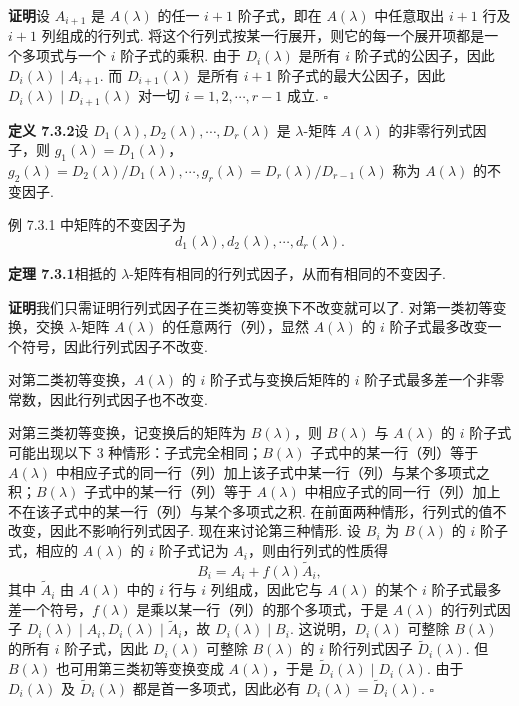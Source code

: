 \documentclass[UTF8, 12pt, fontset=fandol, oneside]{ctexart}
\begin{document}
\noindent\textbf{证明}\quad 设 $A_{i+1}$ 是 $A(\lambda)$ 的任一 $i+1$ 阶子式，即在 $A(\lambda)$ 中任意取出 $i+1$ 行及 $i+1$ 列组成的行列式. 将这个行列式按某一行展开，则它的每一个展开项都是一个多项式与一个 $i$ 阶子式的乘积. 由于 $D_i(\lambda)$ 是所有 $i$ 阶子式的公因子，因此 $D_i(\lambda)\mid A_{i+1}$. 而 $D_{i+1}(\lambda)$ 是所有 $i+1$ 阶子式的最大公因子，因此 $D_i(\lambda)\mid D_{i+1}(\lambda)$ 对一切 $i=1,2,\cdots,r-1$ 成立. $\square$

\noindent\textbf{定义 7.3.2}\quad 设 $D_1(\lambda),D_2(\lambda),\cdots,D_r(\lambda)$ 是 $\lambda$-矩阵 $A(\lambda)$ 的非零行列式因子，则 $g_1(\lambda)=D_1(\lambda)$，$g_2(\lambda)=D_2(\lambda)/D_1(\lambda),\cdots,g_r(\lambda)=D_r(\lambda)/D_{r-1}(\lambda)$ 称为 $A(\lambda)$ 的不变因子.

例 7.3.1 中矩阵的不变因子为
\[
d_1(\lambda),d_2(\lambda),\cdots,d_r(\lambda).
\]

\noindent\textbf{定理 7.3.1}\quad 相抵的 $\lambda$-矩阵有相同的行列式因子，从而有相同的不变因子.

\noindent\textbf{证明}\quad 我们只需证明行列式因子在三类初等变换下不改变就可以了. 对第一类初等变换，交换 $\lambda$-矩阵 $A(\lambda)$ 的任意两行（列），显然 $A(\lambda)$ 的 $i$ 阶子式最多改变一个符号，因此行列式因子不改变.

对第二类初等变换，$A(\lambda)$ 的 $i$ 阶子式与变换后矩阵的 $i$ 阶子式最多差一个非零常数，因此行列式因子也不改变.

对第三类初等变换，记变换后的矩阵为 $B(\lambda)$，则 $B(\lambda)$ 与 $A(\lambda)$ 的 $i$ 阶子式可能出现以下 3 种情形：子式完全相同；$B(\lambda)$ 子式中的某一行（列）等于 $A(\lambda)$ 中相应子式的同一行（列）加上该子式中某一行（列）与某个多项式之积；$B(\lambda)$ 子式中的某一行（列）等于 $A(\lambda)$ 中相应子式的同一行（列）加上不在该子式中的某一行（列）与某个多项式之积. 在前面两种情形，行列式的值不改变，因此不影响行列式因子. 现在来讨论第三种情形. 设 $B_i$ 为 $B(\lambda)$ 的 $i$ 阶子式，相应的 $A(\lambda)$ 的 $i$ 阶子式记为 $A_i$，则由行列式的性质得
\begin{equation}
B_i=A_i+f(\lambda)\widetilde{A}_i,
\tag{7.3.2}
\end{equation}
其中 $\widetilde{A}_i$ 由 $A(\lambda)$ 中的 $i$ 行与 $i$ 列组成，因此它与 $A(\lambda)$ 的某个 $i$ 阶子式最多差一个符号，$f(\lambda)$ 是乘以某一行（列）的那个多项式，于是 $A(\lambda)$ 的行列式因子 $D_i(\lambda)\mid A_i,D_i(\lambda)\mid \widetilde{A}_i$，故 $D_i(\lambda)\mid B_i$. 这说明，$D_i(\lambda)$ 可整除 $B(\lambda)$ 的所有 $i$ 阶子式，因此 $D_i(\lambda)$ 可整除 $B(\lambda)$ 的 $i$ 阶行列式因子 $\widetilde{D}_i(\lambda)$. 但 $B(\lambda)$ 也可用第三类初等变换变成 $A(\lambda)$，于是 $\widetilde{D}_i(\lambda)\mid D_i(\lambda)$. 由于 $D_i(\lambda)$ 及 $\widetilde{D}_i(\lambda)$ 都是首一多项式，因此必有 $D_i(\lambda)=\widetilde{D}_i(\lambda)$. $\square$
\end{document}
